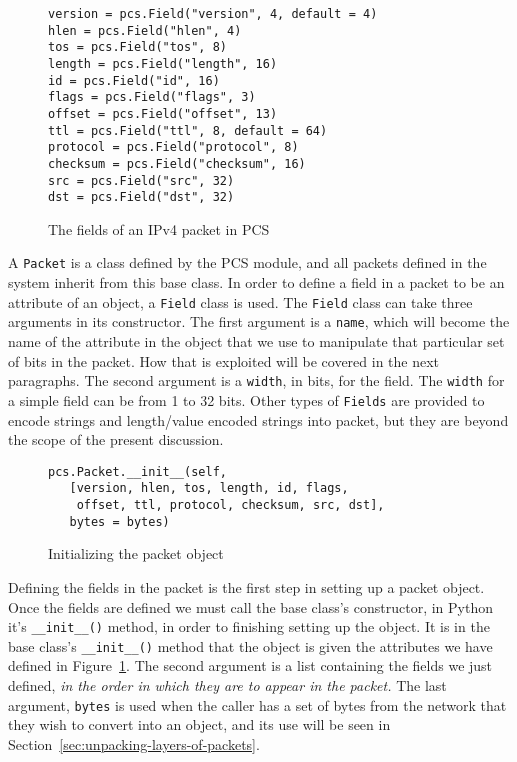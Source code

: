 \documentclass[pdftex]{article}
\begin{document}
\begin{figure}
  \centering
\begin{lstlisting}
version = pcs.Field("version", 4, default = 4)
hlen = pcs.Field("hlen", 4)
tos = pcs.Field("tos", 8)
length = pcs.Field("length", 16)
id = pcs.Field("id", 16)
flags = pcs.Field("flags", 3)
offset = pcs.Field("offset", 13)
ttl = pcs.Field("ttl", 8, default = 64)
protocol = pcs.Field("protocol", 8)
checksum = pcs.Field("checksum", 16)
src = pcs.Field("src", 32)
dst = pcs.Field("dst", 32)
\end{lstlisting}
\caption{The fields of an IPv4 packet in PCS}
  \label{fig:ipv4-packet-in-pcs}
\end{figure}

A \verb|Packet| is a class defined by the PCS module, and all packets
defined in the system inherit from this base class.  In order to
define a field in a packet to be an attribute of an object, a
\verb|Field| class is used.  The \verb|Field| class can take three
arguments in its constructor.  The first argument is a \verb|name|,
which will become the name of the attribute in the object that we use
to manipulate that particular set of bits in the packet.  How that is
exploited will be covered in the next paragraphs.  The second argument
is a \verb|width|, in bits, for the field.  The \verb|width| for a
simple field can be from 1 to 32 bits.  Other types of \verb|Fields|
are provided to encode strings and length/value encoded strings into
packet, but they are beyond the scope of the present discussion.

\begin{figure}
  \centering
  \begin{lstlisting}
pcs.Packet.__init__(self,
   [version, hlen, tos, length, id, flags, 
    offset, ttl, protocol, checksum, src, dst],
   bytes = bytes)
 \end{lstlisting}
 \caption{Initializing the packet object}
  \label{fig:initializing-the-packet-object}
\end{figure}

Defining the fields in the packet is the first step in setting up a
packet object.  Once the fields are defined we must call the base
class's constructor, in Python it's \verb|__init__()| method, in order
to finishing setting up the object.  It is in the base class's
\verb|__init__()| method that the object is given the attributes we
have defined in Figure~\ref{fig:ipv4-packet-in-pcs}.  The second
argument is a list containing the fields we just defined, \emph{in the order
in which they are to appear in the packet.}  The last argument,
\verb|bytes| is used when the caller has a set of bytes from the
network that they wish to convert into an object, and its use will be
seen in Section~\ref{sec:unpacking-layers-of-packets}.
\end{document}
